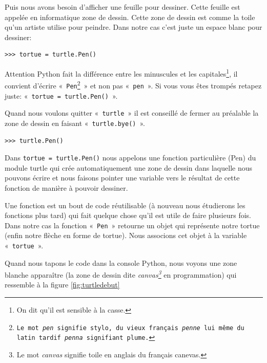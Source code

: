 Puis nous avons besoin d'afficher une feuille pour dessiner. Cette feuille est appelée en informatique zone de dessin. Cette zone de dessin est comme la toile qu'un artiste utilise pour peindre. Dans notre cas c'est juste un espace blanc pour dessiner:

\begin{Verbatim}[frame=single,rulecolor=\color{mbleu}, label=à taper]
>>> tortue = turtle.Pen()
\end{Verbatim}

Attention Python fait la différence entre les minuscules et les capitales\footnote{On dit qu'il est sensible à la casse.}, il convient d'écrire «~\texttt{Pen\footnote{Le mot \emph{pen} signifie stylo, du vieux français \emph{penne} lui même du latin tardif \emph{penna} signifiant plume.
}}~»  et non pas «~\texttt{pen}~». Si vous vous êtes trompés retapez juste: «~\texttt{tortue = turtle.Pen()}~».


Quand nous voulons quitter «~\texttt{turtle}~» il est conseillé de fermer au préalable la zone de dessin en faisant «~\texttt{turtle.bye()}~».

\begin{Verbatim}[frame=single,rulecolor=\color{mbleu}, label=à taper]
>>> turtle.Pen()
\end{Verbatim}


Dans \verb+tortue = turtle.Pen()+ nous appelons une fonction particulière (Pen) du module turtle qui crée automatiquement une zone de dessin dans laquelle nous pouvons écrire et nous faisons pointer une variable vers le résultat de cette fonction de manière à pouvoir dessiner.

Une fonction est un bout de code réutilisable (à nouveau nous étudierons  les fonctions plus tard) qui fait quelque chose qu'il est utile de faire plusieurs fois. Dans notre cas la fonction «~\texttt{Pen}~» retourne un objet qui 
représente notre tortue (enfin notre flèche en forme de tortue). Nous associons cet objet à la variable «~\texttt{tortue}~».

Quand nous tapons le code dans la console Python, nous voyons une zone blanche apparaître (la zone de dessin dite \emph{canvas\footnote{Le mot \emph{canvas} signifie toile en anglais du français canevas.}} en programmation) qui ressemble à la figure \ref{fig:turtledebut}

